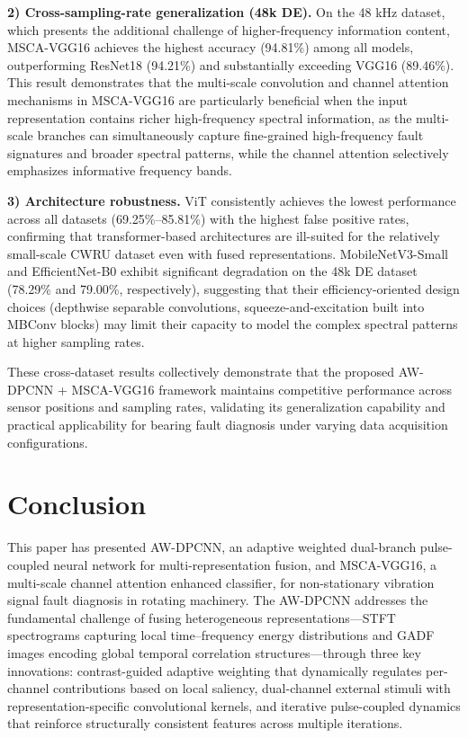 \documentclass[journal]{IEEEtran}
\begin{document}
\textbf{2) Cross-sampling-rate generalization (48k DE).} On the 48 kHz dataset, which presents the additional challenge of higher-frequency information content, MSCA-VGG16 achieves the highest accuracy (94.81\%) among all models, outperforming ResNet18 (94.21\%) and substantially exceeding VGG16 (89.46\%). This result demonstrates that the multi-scale convolution and channel attention mechanisms in MSCA-VGG16 are particularly beneficial when the input representation contains richer high-frequency spectral information, as the multi-scale branches can simultaneously capture fine-grained high-frequency fault signatures and broader spectral patterns, while the channel attention selectively emphasizes informative frequency bands.

\textbf{3) Architecture robustness.} ViT consistently achieves the lowest performance across all datasets (69.25\%--85.81\%) with the highest false positive rates, confirming that transformer-based architectures are ill-suited for the relatively small-scale CWRU dataset even with fused representations. MobileNetV3-Small and EfficientNet-B0 exhibit significant degradation on the 48k DE dataset (78.29\% and 79.00\%, respectively), suggesting that their efficiency-oriented design choices (depthwise separable convolutions, squeeze-and-excitation built into MBConv blocks) may limit their capacity to model the complex spectral patterns at higher sampling rates.

These cross-dataset results collectively demonstrate that the proposed AW-DPCNN + MSCA-VGG16 framework maintains competitive performance across sensor positions and sampling rates, validating its generalization capability and practical applicability for bearing fault diagnosis under varying data acquisition configurations.

\section{Conclusion}
\label{section5}

This paper has presented AW-DPCNN, an adaptive weighted dual-branch pulse-coupled neural network for multi-representation fusion, and MSCA-VGG16, a multi-scale channel attention enhanced classifier, for non-stationary vibration signal fault diagnosis in rotating machinery. The AW-DPCNN addresses the fundamental challenge of fusing heterogeneous representations—STFT spectrograms capturing local time--frequency energy distributions and GADF images encoding global temporal correlation structures—through three key innovations: contrast-guided adaptive weighting that dynamically regulates per-channel contributions based on local saliency, dual-channel external stimuli with representation-specific convolutional kernels, and iterative pulse-coupled dynamics that reinforce structurally consistent features across multiple iterations.
\end{document}
